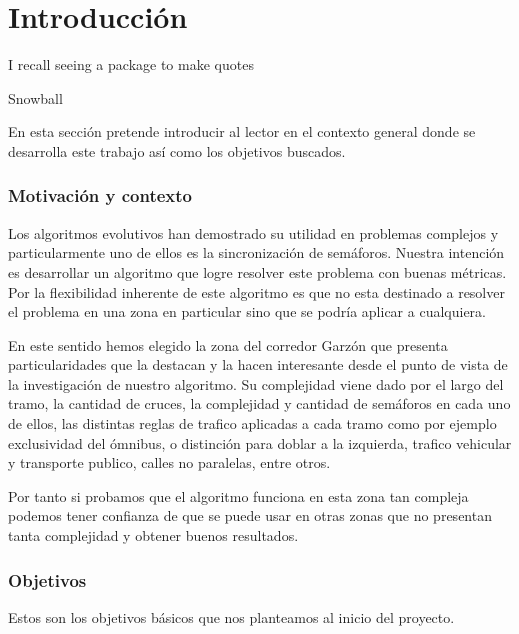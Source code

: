 \chapter{Introducción}
\epigraph{I recall seeing a package to make quotes}{Snowball}

En esta sección pretende introducir al lector en el contexto general donde se desarrolla este trabajo así como los objetivos buscados.

\subsection{Motivación y contexto}

Los algoritmos evolutivos han demostrado su utilidad en problemas complejos y particularmente uno de ellos es la sincronización de semáforos. Nuestra intención es desarrollar un algoritmo que logre resolver este problema con buenas métricas.
Por la flexibilidad inherente de este algoritmo es que no esta destinado a resolver el problema en una zona en particular sino que se podría aplicar a cualquiera.

En este sentido hemos elegido la zona del corredor Garzón que presenta particularidades que la destacan y la hacen interesante desde el punto de vista de la investigación de nuestro algoritmo. Su complejidad viene dado por el largo del tramo, la cantidad de cruces, la complejidad y cantidad de semáforos en cada uno de ellos, las distintas reglas de trafico aplicadas a cada tramo como por ejemplo exclusividad del ómnibus, o distinción para doblar a la izquierda, trafico vehicular y transporte publico, calles no paralelas, entre otros.

Por tanto si probamos que el algoritmo funciona en esta zona tan compleja podemos tener confianza de que se puede usar en otras zonas que no presentan tanta complejidad y obtener buenos resultados.



\newpage

\subsection{Objetivos}

Estos son los objetivos básicos que nos planteamos al inicio del  proyecto.


